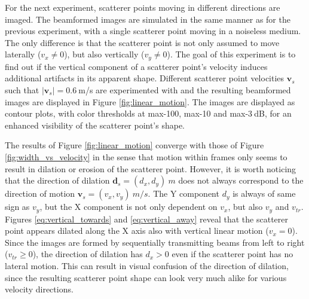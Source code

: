 For the next experiment, scatterer points moving in different directions are imaged. The beamformed images are simulated in the same manner as for the previous experiment, with a single scatterer point moving in a noiseless medium. The only difference is that the scatterer point is not only assumed to move laterally ($v_x \neq 0$), but also vertically ($v_y \neq 0$). The goal of this experiment is to find out if the vertical component of a scatterer point's velocity induces additional artifacts in its apparent shape. Different scatterer point velocities $\boldsymbol{v}_s$  such that $|\boldsymbol{v}_s| = 0.6~$m/s are experimented with and the resulting beamformed images are displayed in Figure \ref{fig:linear_motion}. The images are displayed as contour plots, with color thresholds at max-100, max-10 and max-3$~$dB, for an enhanced visibility of the scatterer point's shape.

The results of Figure \ref{fig:linear_motion} converge with those of Figure \ref{fig:width_vs_velocity} in the sense that motion within frames only seems to result in dilation or erosion of the scatterer point. However, it is worth noticing that the direction of dilation $\boldsymbol{d}_s = (d_x, d_y)~m$ does not always correspond to the direction of motion $\boldsymbol{v}_s = (v_x, v_y)~m/s$. 
The Y component $d_y$ is always of same sign as $v_y$, but the X component is not only dependent on $v_x$, but also $v_y$ and $v_{tr}$.
Figures \ref{eq:vertical_towards} and \ref{eq:vertical_away} reveal that the scatterer point appears dilated along the X axis also with vertical linear motion ($v_x = 0$). 
Since the images are formed by sequentially transmitting beams from left to right ($v_{tr} \geq 0$), the direction of dilation has $d_x >0$ even if the scatterer point has no lateral motion. This can result in visual confusion of the direction of dilation, since the resulting scatterer point shape can look very much alike for various velocity directions.


